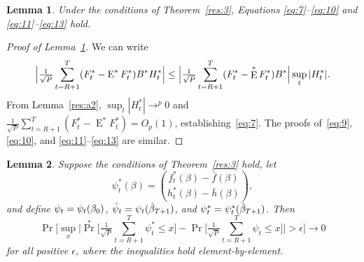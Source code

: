 \documentclass[12pt,fleqn]{article}
\newtheorem{lema}{Lemma}[section]
\theoremstyle{definition}
\DeclareMathOperator{\E}{E}
\DeclareMathOperator{\pr}{Pr}
\newcommand{\btrue}[1][]{\if#1*\hat\beta_{T+1}\else\beta_0\fi}
\newcommand{\osum}[1]{\sum_{#1=R+1}^T}
\newcommand{\oclt}[1]{\tfrac{1}{\sqrt{P}} \osum{#1}}
\begin{document}
\begin{lema}\label{res:a4}
  Under the conditions of Theorem~\ref{res:3}, Equations
  \eqref{eq:7}--\eqref{eq:10} and \eqref{eq:11}--\eqref{eq:13} hold.
\end{lema}

\begin{proof}[Proof of Lemma~\ref{res:a4}]
We can write
\begin{equation*}
  \Big\lvert \WesA[*] \Big\rvert \leq 
  \Big\lvert \oclt{t} (F_t^* - \E^* F^*_t) B^* \Big\rvert
  \sup_t | H_t^* |.
\end{equation*}
From Lemma~\ref{res:a2}, $\sup_t | H_t^* | \to^p 0$ and $\oclt{t}
(F_t^* - \E^* F_t^*) = O_p(1)$, establishing~\eqref{eq:7}.  The proofs
of~\eqref{eq:9}, \eqref{eq:10}, and \eqref{eq:11}--\eqref{eq:13} are
similar.
\end{proof}

\begin{lema}\label{res:a3}
  Suppose the conditions of Theorem~\ref{res:3} hold, let
  \[\psi_t^{*}(\beta) = 
  \binom{f_t^{*}(\beta) - \bar{f}(\beta)}{h_t^{*}(\beta) - \bar h(\beta)},\]
  and define $\psi_t = \psi_t(\btrue)$, $\hat\psi_t = \psi_t(\btrue[*])$, and 
  $\psi_t^* = \psi_t^*(\btrue[*])$.  Then
  \begin{equation}\label{eq:1}
    \pr\Big[\sup_x \Big| \pr^{*}\Big[ \oclt{t} \psi_{t}^{*}
    \leq x \Big] - \pr\Big[ \oclt{t} \psi_{t}
    \leq x \Big] \Big| > \epsilon \Big] \to 0
  \end{equation}
  for all positive $\epsilon$, where the inequalities hold element-by-element.
\end{lema}
\end{document}
